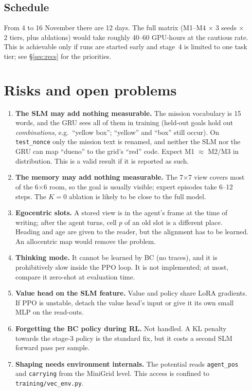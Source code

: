 \documentclass[11pt,a4paper]{article}
\newcommand{\code}[1]{\texttt{\small #1}}
\begin{document}
\subsection{Schedule}

From 4 to 16 November there are 12 days. The full matrix (M1--M4 $\times$ 3 seeds $\times$ 2 tiers, plus ablations)
would take roughly 40--60 GPU-hours at the cautious rate. This is achievable only if runs are started early and stage~4
is limited to one task tier; see \S\ref{sec:recs} for the priorities.

\section{Risks and open problems}
\label{sec:risks}

\begin{enumerate}
  \item \textbf{The SLM may add nothing measurable.} The mission vocabulary is 15 words, and the GRU sees all of them
  in training (held-out goals hold out \emph{combinations}, e.g.\ ``yellow box''; ``yellow'' and ``box'' still occur).
  On \code{test\_nonce} only the mission text is renamed, and neither the SLM nor the GRU can map ``dueno'' to the
  grid's ``red'' code. Expect M1 $\approx$ M2/M3 in distribution. This is a valid result if it is reported as such.
  \item \textbf{The memory may add nothing measurable.} The 7$\times$7 view covers most of the 6$\times$6 room, so the
  goal is usually visible; expert episodes take 6--12 steps. The $K{=}0$ ablation is likely to be close to the full model.
  \item \textbf{Egocentric slots.} A stored view is in the agent's frame at the time of writing; after the agent turns,
  cell $p$ of an old slot is a different place. Heading and age are given to the reader, but the alignment has to be
  learned. An allocentric map would remove the problem.
  \item \textbf{Thinking mode.} It cannot be learned by BC (no traces), and it is prohibitively slow inside the PPO
  loop. It is not implemented; at most, compare it zero-shot at evaluation time.
  \item \textbf{Value head on the SLM feature.} Value and policy share LoRA gradients. If PPO is unstable, detach the
  value head's input or give it its own small MLP on the read-outs.
  \item \textbf{Forgetting the BC policy during RL.} Not handled. A KL penalty towards the stage-3 policy is the
  standard fix, but it costs a second SLM forward pass per sample.
  \item \textbf{Shaping needs environment internals.} The potential reads \code{agent\_pos} and \code{carrying} from the
  MiniGrid level. This access is confined to \code{training/vec\_env.py}.
\end{enumerate}
\end{document}
